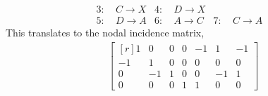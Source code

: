 \begin{enumerate}
\begin{enumerate}
\begin{align}
                        3 :\  & C \to X & 4 :\  & D \to X   \\
                        5 :\  & D \to A & 6 :\  & A \to C &
                        7 :\  & C \to A &
                    \end{align}
                    This translates to the nodal incidence matrix,
                    \begin{align}
                        \begin{bmatrix*}[r]
                            1  & 0  & 0 & 0 & -1 & 1  & -1 \\
                            -1 & 1  & 0 & 0 & 0  & 0  & 0  \\
                            0  & -1 & 1 & 0 & 0  & -1 & 1  \\
                            0  & 0  & 0 & 1 & 1  & 0  & 0
                        \end{bmatrix*}
                    \end{align}


\end{enumerate}
\end{enumerate}
